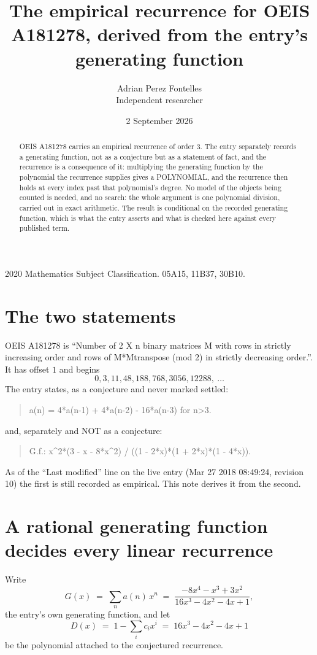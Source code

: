 \documentclass[11pt,a4paper]{article}
\title{The empirical recurrence for OEIS A181278, derived from the entry's generating function}
\author{Adrian Perez Fontelles\\ \small Independent researcher}
\date{2 September 2026}
\theoremstyle{plain}
\theoremstyle{definition}
\begin{document}
\maketitle

\begin{abstract}
OEIS A181278 carries an empirical recurrence of order $3$. The entry separately records a
generating function, not as a conjecture but as a statement of fact, and the recurrence is a
consequence of it: multiplying the generating function by the polynomial the recurrence
supplies gives a POLYNOMIAL, and the recurrence then holds at every index past that
polynomial's degree. No model of the objects being counted is needed, and no search: the
whole argument is one polynomial division, carried out in exact arithmetic. The result is
conditional on the recorded generating function, which is what the entry asserts and what is
checked here against every published term.
\end{abstract}

\noindent\small 2020 Mathematics Subject Classification. 05A15, 11B37, 30B10.\normalsize

\section{The two statements}

OEIS A181278 is ``Number of 2 X n binary matrices M with rows in strictly increasing order and rows of M*Mtranspose (mod 2) in strictly decreasing order.''. It has offset $1$ and begins
\[
0, 3, 11, 48, 188, 768, 3056, 12288,\ \dots
\]
The entry states, as a conjecture and never marked settled:
\begin{quote}
a(n) = 4*a(n-1) + 4*a(n-2) - 16*a(n-3) for n>3.
\end{quote}
and, separately and NOT as a conjecture:
\begin{quote}
G.f.: x\^{}2*(3 - x - 8*x\^{}2) / ((1 - 2*x)*(1 + 2*x)*(1 - 4*x)).
\end{quote}
As of the ``Last modified'' line on the live entry (Mar 27 2018 08:49:24, revision 10) the first is still
recorded as empirical. This note derives it from the second.

\section{A rational generating function decides every linear recurrence}

Write
\[
G(x)\;=\;\sum_{n}a(n)\,x^{n}\;=\;\frac{- 8 x^{4} - x^{3} + 3 x^{2}}{16 x^{3} - 4 x^{2} - 4 x + 1},
\]
the entry's own generating function, and let
\[
D(x)\;=\;1-\sum_i c_i x^{i}\;=\;16 x^{3} - 4 x^{2} - 4 x + 1
\]
be the polynomial attached to the conjectured recurrence.
\end{document}
